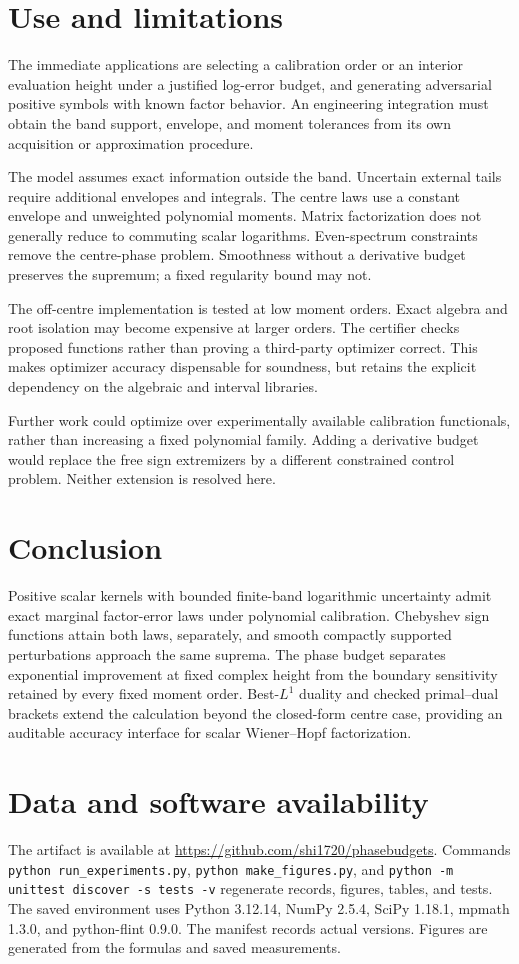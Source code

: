 \documentclass[11pt]{article}
\theoremstyle{remark}\newtheorem{remark}[theorem]{Remark}
\begin{document}
\section{Use and limitations}
The immediate applications are selecting a calibration order or an interior
evaluation height under a justified log-error budget, and generating
adversarial positive symbols with known factor behavior.
An engineering integration must obtain the band support, envelope, and moment
tolerances from its own acquisition or approximation procedure.

The model assumes exact information outside the band. Uncertain external tails
require additional envelopes and integrals. The centre laws use a constant
envelope and unweighted polynomial moments. Matrix factorization does not
generally reduce to commuting scalar logarithms. Even-spectrum constraints
remove the centre-phase problem. Smoothness without a derivative budget
preserves the supremum; a fixed regularity bound may not.

The off-centre implementation is tested at low moment orders.
Exact algebra and root isolation may become expensive at larger orders.
The certifier checks proposed functions rather than proving a third-party
optimizer correct. This makes optimizer accuracy dispensable for soundness,
but retains the explicit dependency on the algebraic and interval libraries.

Further work could optimize over experimentally available calibration
functionals, rather than increasing a fixed polynomial family.
Adding a derivative budget would replace the free sign extremizers by a
different constrained control problem. Neither extension is resolved here.

\section{Conclusion}
Positive scalar kernels with bounded finite-band logarithmic uncertainty
admit exact marginal factor-error laws under polynomial calibration.
Chebyshev sign functions attain both laws, separately, and smooth compactly
supported perturbations approach the same suprema.
The phase budget separates exponential improvement at fixed complex height
from the boundary sensitivity retained by every fixed moment order.
Best-$L^1$ duality and checked primal--dual brackets extend the calculation
beyond the closed-form centre case, providing an auditable accuracy interface
for scalar Wiener--Hopf factorization.

\section*{Data and software availability}
The artifact is available at \url{https://github.com/shi1720/phasebudgets}.
Commands \texttt{python run\_experiments.py},
\texttt{python make\_figures.py}, and
\texttt{python -m unittest discover -s tests -v}
regenerate records, figures, tables, and tests.
The saved environment uses Python 3.12.14, NumPy 2.5.4,
SciPy 1.18.1, mpmath 1.3.0, and python-flint 0.9.0.
The manifest records actual versions.
Figures are generated from the formulas and saved measurements.
\end{document}
